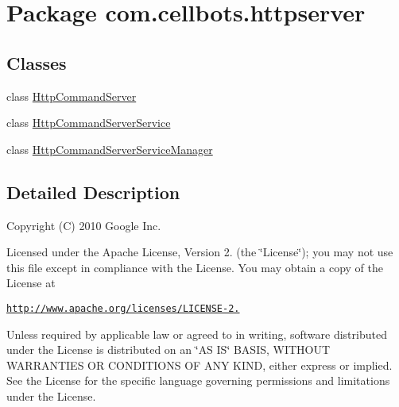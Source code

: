 \hypertarget{namespacecom_1_1cellbots_1_1httpserver}{\section{Package com.\-cellbots.\-httpserver}
\label{namespacecom_1_1cellbots_1_1httpserver}
}
\subsection*{Classes}
\begin{DoxyCompactItemize}
\item 
class \hyperlink{classcom_1_1cellbots_1_1httpserver_1_1_http_command_server}{Http\-Command\-Server}
\item 
class \hyperlink{classcom_1_1cellbots_1_1httpserver_1_1_http_command_server_service}{Http\-Command\-Server\-Service}
\item 
class \hyperlink{classcom_1_1cellbots_1_1httpserver_1_1_http_command_server_service_manager}{Http\-Command\-Server\-Service\-Manager}
\end{DoxyCompactItemize}


\subsection{Detailed Description}
Copyright (C) 2010 Google Inc.

Licensed under the Apache License, Version 2. (the \char`\"{}\-License\char`\"{}); you may not use this file except in compliance with the License. You may obtain a copy of the License at

\href{http://www.apache.org/licenses/LICENSE-2.0}{\tt http\-://www.\-apache.\-org/licenses/\-L\-I\-C\-E\-N\-S\-E-\/2.}

Unless required by applicable law or agreed to in writing, software distributed under the License is distributed on an \char`\"{}\-A\-S I\-S\char`\"{} B\-A\-S\-I\-S, W\-I\-T\-H\-O\-U\-T W\-A\-R\-R\-A\-N\-T\-I\-E\-S O\-R C\-O\-N\-D\-I\-T\-I\-O\-N\-S O\-F A\-N\-Y K\-I\-N\-D, either express or implied. See the License for the specific language governing permissions and limitations under the License. 